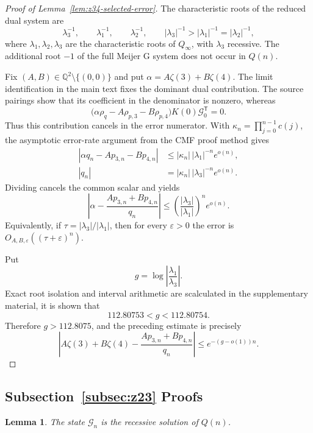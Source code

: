 \documentclass[oneside,english,11pt]{amsart}
\newtheorem{lemma}[thm]{Lemma}
\begin{document}
\begin{proof}[Proof of Lemma~\ref{lem:z34-selected-error}]
\label{app:z34-error}
The characteristic roots of the reduced dual system are
\[
\lambda_3^{-1},\qquad \lambda_1^{-1},\qquad \lambda_2^{-1},
\qquad |\lambda_3|^{-1}>|\lambda_1|^{-1}=|\lambda_2|^{-1},
\]
where $\lambda_1,\lambda_2,\lambda_3$ are the characteristic roots
of $Q_\infty$, with $\lambda_3$ recessive. The additional root $-1$
of the full Meijer G system does not occur in $Q(n)$.

Fix $(A,B)\in\mathbb Q^2\setminus\{(0,0)\}$ and put
$\alpha=A\zeta(3)+B\zeta(4)$.
The limit identification in the main text fixes the dominant dual
contribution. The source pairings show that its coefficient in the
denominator is nonzero, whereas
\[
\bigl(\alpha\rho_q-A\rho_{p,3}-B\rho_{p,4}\bigr)
K(0)\mathcal G_0^{\mathsf T}=0.
\]
Thus this contribution cancels in the error numerator.
With $\kappa_n=\prod_{j=0}^{n-1}c(j)$, the asymptotic error-rate
argument from the CMF proof method gives
\[
\begin{aligned}
|\alpha q_n-Ap_{3,n}-Bp_{4,n}|
&\leq|\kappa_n|\,|\lambda_1|^{-n}e^{o(n)},\\
|q_n|&=|\kappa_n|\,|\lambda_3|^{-n}e^{o(n)}.
\end{aligned}
\]
Dividing cancels the common scalar and yields
\[
\left|\alpha-\frac{Ap_{3,n}+Bp_{4,n}}{q_n}\right|
\leq\left(\frac{|\lambda_3|}{|\lambda_1|}\right)^n e^{o(n)}.
\]
Equivalently, if $\tau=|\lambda_3|/|\lambda_1|$, then for every
$\varepsilon>0$ the error is
$O_{A,B,\varepsilon}((\tau+\varepsilon)^n)$.

Put
\[
g=\log\left|\frac{\lambda_1}{\lambda_3}\right|.
\]
Exact root isolation and interval arithmetic are scalculated in the supplementary material, it is shown that 
\[
112.80753<g<112.80754.
\]
Therefore $g>112.8075$, and the preceding estimate is precisely
\[
\left|A\zeta(3)+B\zeta(4)
       -\frac{Ap_{3,n}+Bp_{4,n}}{q_n}\right|
\leq e^{-(g-o(1))n}.
\]
\end{proof}

\subsection{Subsection~\ref{subsec:z23} Proofs}
\label{app:zeta2-proof}
\begin{lemma}\label{lem:z2-recessive}\label{app:z2-recessive}
The state $\mathcal G_n$ is the recessive solution of $Q(n)$.
\end{lemma}
\end{document}

